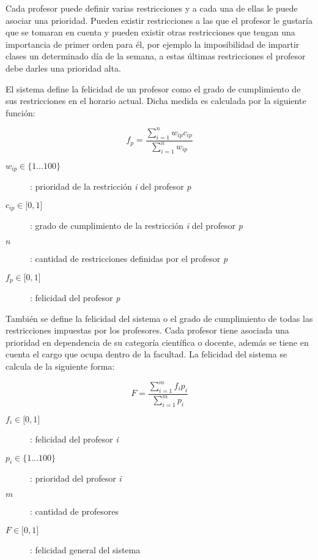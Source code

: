 Cada profesor puede definir varias restricciones y a cada una de ellas le puede asociar una prioridad. Pueden existir restricciones a las que el profesor le gustar\'ia que se tomaran en cuenta y pueden existir otras restricciones que tengan una importancia de primer orden para \'el, por ejemplo la imposibilidad de impartir clases un determinado d\'ia de la semana, a estas \'ultimas restricciones el profesor debe darles una prioridad alta.

El sistema define la felicidad de un profesor como el grado de cumplimiento de sus restricciones en el horario actual. Dicha medida es calculada por la siguiente funci\'on:

\[ f_{p} = \frac{\sum\limits_{i=1}^n w_{ip} c_{ip}}{\sum\limits_{i=1}^n w_{ip}} \]

\begin{description}

\item[$w_{ip} \in \{1 \ldots 100\}$]: prioridad de la restricci\'on \emph{i} del profesor \emph{p}
\item[$c_{ip} \in \lbrack 0,1 \rbrack$]: grado de cumplimiento de la restricci\'on \emph{i} del profesor \emph{p}
\item[$n$]: cantidad de restricciones definidas por el profesor \emph{p}
\item[$f_{p} \in \lbrack 0,1 \rbrack$]: felicidad del profesor \emph{p}

\end{description}

Tambi\'en se define la felicidad del sistema o el grado de cumplimiento de todas las restricciones impuestas por los profesores. Cada profesor tiene asociada una prioridad en dependencia de su categor\'ia cient\'ifica o docente, adem\'as se tiene en cuenta el cargo que ocupa dentro de la facultad. La felicidad del sistema se calcula de la siguiente forma:

\[ F = \frac{\sum\limits_{i=1}^m f_{i} p_{i}}{\sum\limits_{i=1}^m p_{i}} \]

\begin{description}

\item[$f_{i} \in \lbrack 0,1 \rbrack$]: felicidad del profesor \emph{i}
\item[$p_{i} \in \{1 \ldots 100\}$]: prioridad del profesor \emph{i}
\item[$m$]: cantidad de profesores
\item[$F \in \lbrack 0,1 \rbrack$]: felicidad general del sistema

\end{description}

